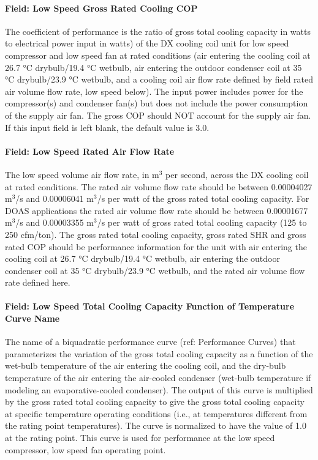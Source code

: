 \paragraph{Field: Low Speed Gross Rated Cooling COP}\label{field-low-speed-gross-rated-cooling-cop}

The coefficient of performance is the ratio of gross total cooling capacity in watts to electrical power input in watts) of the DX cooling coil unit for low speed compressor and low speed fan at rated conditions (air entering the cooling coil at 26.7 °C drybulb/19.4 °C wetbulb, air entering the outdoor condenser coil at 35 °C drybulb/23.9 °C wetbulb, and a cooling coil air flow rate defined by field rated air volume flow rate, low speed below). The input power includes power for the compressor(s) and condenser fan(s) but does not include the power consumption of the supply air fan. The gross COP should NOT account for the supply air fan. If this input field is left blank, the default value is 3.0.

\paragraph{Field: Low Speed Rated Air Flow Rate}\label{field-low-speed-rated-air-flow-rate}

The low speed volume air flow rate, in m\(^{3}\) per second, across the DX cooling coil at rated conditions. The rated air volume flow rate should be between 0.00004027 m\(^{3}\)/s and 0.00006041 m\(^{3}\)/s per watt of the gross rated total cooling capacity. For DOAS applications the rated air volume flow rate should be between 0.00001677 m\(^{3}\)/s and 0.00003355 m\(^{3}\)/s per watt of gross rated total cooling capacity (125 to 250 cfm/ton). The gross rated total cooling capacity, gross rated SHR and gross rated COP should be performance information for the unit with air entering the cooling coil at 26.7 °C drybulb/19.4 °C wetbulb, air entering the outdoor condenser coil at 35 °C drybulb/23.9 °C wetbulb, and the rated air volume flow rate defined here.

\paragraph{Field: Low Speed Total Cooling Capacity Function of Temperature Curve Name}\label{field-low-speed-total-cooling-capacity-function-of-temperature-curve-name}

The name of a biquadratic performance curve (ref: Performance Curves) that parameterizes the variation of the gross total cooling capacity as a function of the wet-bulb temperature of the air entering the cooling coil, and the dry-bulb temperature of the air entering the air-cooled condenser (wet-bulb temperature if modeling an evaporative-cooled condenser). The output of this curve is multiplied by the gross rated total cooling capacity to give the gross total cooling capacity at specific temperature operating conditions (i.e., at temperatures different from the rating point temperatures). The curve is normalized to have the value of 1.0 at the rating point. This curve is used for performance at the low speed compressor, low speed fan operating point.

